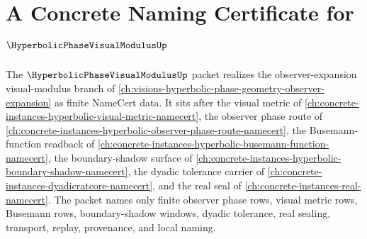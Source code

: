 \chapter{A Concrete Naming Certificate for $\HyperbolicPhaseVisualModulusUp$}
\label{ch:concrete-instances-hyperbolic-phase-visual-modulus-namecert}

The $\HyperbolicPhaseVisualModulusUp$ packet realizes the observer-expansion visual-modulus branch of \autoref{ch:visions-hyperbolic-phase-geometry-observer-expansion} as finite NameCert data. It sits after the visual metric of \autoref{ch:concrete-instances-hyperbolic-visual-metric-namecert}, the observer phase route of \autoref{ch:concrete-instances-hyperbolic-observer-phase-route-namecert}, the Busemann-function readback of \autoref{ch:concrete-instances-hyperbolic-busemann-function-namecert}, the boundary-shadow surface of \autoref{ch:concrete-instances-hyperbolic-boundary-shadow-namecert}, the dyadic tolerance carrier of \autoref{ch:concrete-instances-dyadicratcore-namecert}, and the real seal of \autoref{ch:concrete-instances-real-namecert}. The packet names only finite observer phase rows, visual metric rows, Busemann rows, boundary-shadow windows, dyadic tolerance, real sealing, transport, replay, provenance, and local naming.

